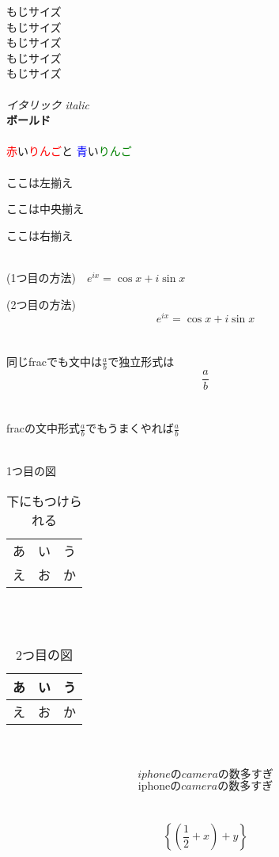 \documentclass{ltjsarticle}
\begin{document}
\noindent
{\small もじサイズ}\\
もじサイズ\\
{\large もじサイズ}\\
{\Large もじサイズ}\\
{\LARGE もじサイズ}
\\ \\
\noindent
{\it イタリック italic}\\
{\bf ボールド}
\\ \\
\textcolor{red}{赤}い\textcolor{red}{りんご}と
\textcolor{blue}{青}い\textcolor{green}{りんご}
\\ \\
\noindent
ここは左揃え
\begin{center}
ここは中央揃え
\end{center}
\hfill ここは右揃え
\\ \\
\noindent
\begin{center}
(1つ目の方法)　$e^{ix}=\cos x+i\sin x$
\end{center}
(2つ目の方法)　$$e^{ix}=\cos x+i\sin x$$
\\ \\
\noindent
同じfracでも文中は$\frac{a}{b}$で独立形式は$$\frac{a}{b}$$
\\ \\
\noindent
fracの文中形式$\frac{a}{b}$でもうまくやれば$\displaystyle\frac{a}{b}$
\\ \\
\noindent
\begin{table}[htb]
\caption{1つ目の図}
\centering
\begin{tabular}{lll}
    あ & い & う \\
    え & お & か
\end{tabular}
\caption{下にもつけられる}
\end{table}
\\ \\
\noindent 
\begin{table}[htb]
\caption{2つ目の図}
\centering
\begin{tabular}{|l||l|l|} \hline
    あ & い & う \\ \hline
    え & お & か \\ \hline
\end{tabular}
\end{table}
\\ \\
\noindent
$$iphone の camera の数多すぎ$$
$$\mathrm{iphone} の camera の数多すぎ$$
\\ \\
\noindent
$$\left\{ \left( \dfrac{1}{2}+x\right) +y \right\}$$
\end{document}
